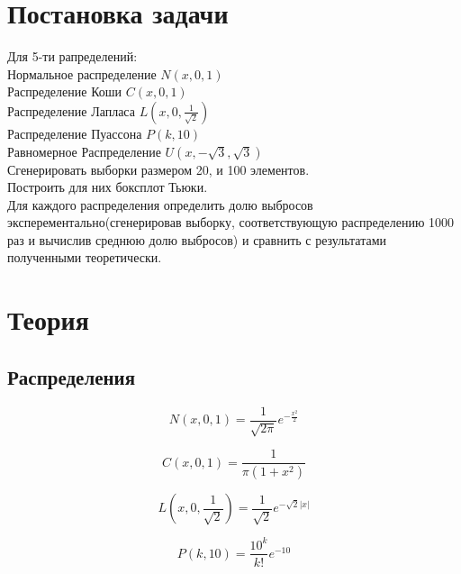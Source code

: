 \documentclass[a4]{article}
\begin{document}
	
	\newpage
	\tableofcontents{}
	\newpage
	\listoffigures
	\newpage
	\listoftables
	\newpage
	
	
	\section{Постановка задачи}
	
	Для 5-ти рапределений:\\
		Нормальное распределение $N(x,0,1)$\\
		Распределение Коши $C(x,0,1)$\\
		Распределение Лапласа $L( x,0,\frac{1}{\sqrt{2}})$\\
		Распределение Пуассона $P(k, 10)$\\
		Равномерное Распределение $U(x,-\sqrt{3}, \sqrt{3})$\\
		
		Сгенерировать выборки размером 20, и 100 элементов.\\
		Построить для них боксплот Тьюки.\\
		Для каждого распределения определить долю выбросов эксперементально(сгенерировав выборку, соответствующую распределению 1000 раз и вычислив среднюю долю выбросов) и сравнить с результатами полученными теоретически.
		
	
	\section{Теория}
		\subsection{Распределения}
		
			\begin{equation}\label{eqn:normal}
			N(x,0,1) = \frac{1}{\sqrt{2\pi}}e^{-\frac{x^2}{2}}
			\end{equation} 
			
			\begin{equation}\label{eqn:cauchy}
			C(x,0,1) = \frac{1}{\pi(1+x^2)}
			\end{equation}
			
			\begin{equation}\label{eqn:laplace}
			L\left( x,0,\frac{1}{\sqrt{2}}\right) = \frac{1}{\sqrt{2}}e^{-\sqrt{2}\vert x\vert}
			\end{equation}
			
			\begin{equation}\label{eqn:poisson}
			P(k,10) = \frac{10^k}{k!}e^{-10}
			\end{equation}  
			
\end{document}
